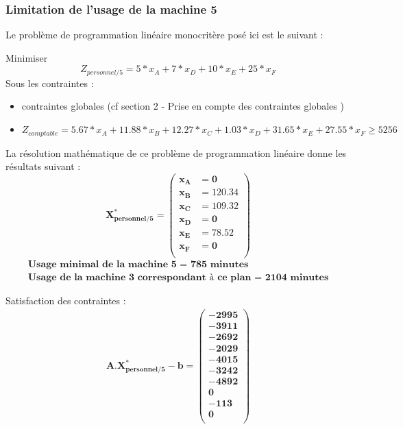 \documentclass[12pt]{article}
\begin{document}
\subsubsection{Limitation de l'usage de la machine 5}
Le problème de programmation linéaire monocritère posé ici est le suivant :
\begin{tcolorbox}
Minimiser
\begin{equation*}
 Z_{personnel/5}= 5*x_{A} + 7*x_{D} + 10*x_{E} + 25*x_{F}
\end{equation*}
Sous les contraintes :
\begin{itemize}
\item contraintes globales (cf section 2 - Prise en compte des contraintes globales )
\item $ Z_{comptable}= 5.67*x_{A} +11.88*x_{B} +12.27*x_{C} +1.03*x_{D} +31.65*x_{E} +27.55*x_{F} \geq 5256$
\end{itemize}
\end{tcolorbox}
La résolution mathématique de ce problème de programmation linéaire donne les résultats suivant :\\
\begin{equation*}
\boldsymbol{X^{*}_{personnel/5} = 
   \left (
   \begin{aligned}
      x_{A} &= 0 \\
      x_{B} &= 120.34 \\
      x_{C} &= 109.32 \\
      x_{D} &= 0 \\
      x_{E} &= 78.52 \\ 
      x_{F} &= 0 \\
   \end{aligned}
   \right )
 } 
\end{equation*}
\begin{align*}
\textbf{Usage minimal de la machine 5 = 785 minutes} \\
\textbf{Usage de la machine 3 correspondant à ce plan = 2104 minutes}
\end{align*}


Satisfaction des contraintes : 
\begin{align*}
\boldsymbol{A.X^{*}_{personnel/5} - b = 
   \left (
   \begin{aligned}
      -2995 \\
      -3911 \\
      -2692 \\
      -2029 \\
      -4015 \\
      -3242 \\
      -4892 \\
      0 \\
      -113 \\
      0\\
   \end{aligned}
   \right )
 } 
\end{align*}
\end{document}
